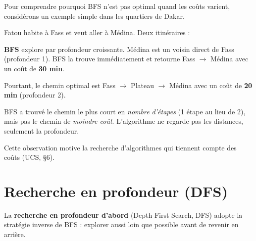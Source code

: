 \documentclass[11pt,a4paper]{article}
\begin{document}
Pour comprendre pourquoi BFS n'est pas optimal quand les coûts varient, considérons un exemple simple dans les quartiers de Dakar.

\begin{exemplebox}
Fatou habite à Fass et veut aller à Médina. Deux itinéraires :

\begin{center}
\end{center}

\textbf{BFS} explore par profondeur croissante. Médina est un voisin direct de Fass (profondeur 1). BFS la trouve immédiatement et retourne Fass $\rightarrow$ Médina avec un coût de \textbf{30 min}.

Pourtant, le chemin optimal est Fass $\rightarrow$ Plateau $\rightarrow$ Médina avec un coût de \textbf{20 min} (profondeur 2).

BFS a trouvé le chemin le plus court en \textit{nombre d'étapes} (1 étape au lieu de 2), mais pas le chemin de \textit{moindre coût}. L'algorithme ne regarde pas les distances, seulement la profondeur.
\end{exemplebox}

Cette observation motive la recherche d'algorithmes qui tiennent compte des coûts (UCS, §6).

\section{Recherche en profondeur (DFS)}

La \textbf{recherche en profondeur d'abord} (Depth-First Search, DFS) adopte la stratégie inverse de BFS : explorer aussi loin que possible avant de revenir en arrière.
\end{document}
